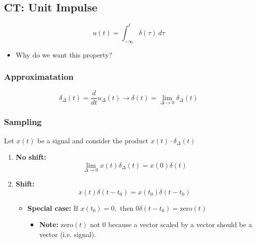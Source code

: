 \subsection{CT: Unit Impulse}
\begin{definition}
    \begin{equation}
        u(t) = \int_{-\infty}^{t} \delta(\tau) \, d\tau
    \end{equation}
    \begin{itemize}
        \item Why do we want this property?
    \end{itemize}
\end{definition}

    \subsubsection{Approximatation}
    \begin{derivation}
        \begin{equation}
            \delta_{\Delta}(t) = \frac{d}{dt} u_{\Delta}(t) \rightarrow \delta(t) = \lim_{\Delta \to 0} \delta_{\Delta}(t)
        \end{equation}

    \end{derivation}

    \subsubsection{Sampling}
    \begin{definition}
        Let $x(t)$ be a signal and consider the product $x(t) \cdot \delta_{\Delta} (t)$

        \begin{enumerate}
            \item \textbf{No shift:}
            \begin{equation}
                \lim_{\Delta \to 0} x(t) \delta_{\Delta}(t) = x(0) \delta(t)
            \end{equation}

            \item \textbf{Shift:}
            \begin{equation}
                x(t) \delta(t - t_0) = x(t_0) \delta(t - t_0)                
            \end{equation}

            \begin{itemize}
                \item \textbf{Special case:} $\text{If } x(t_0) = 0, \text{ then } 0 \delta(t - t_0) = \text{zero}(t)$ 
                \begin{itemize}
                    \item \textbf{Note:} $\text{zero}(t)$ not $0$ because a vector scaled by a vector should be a vector (i.e. signal).
                \end{itemize}
            \end{itemize} 
        \end{enumerate}
    \end{definition}
